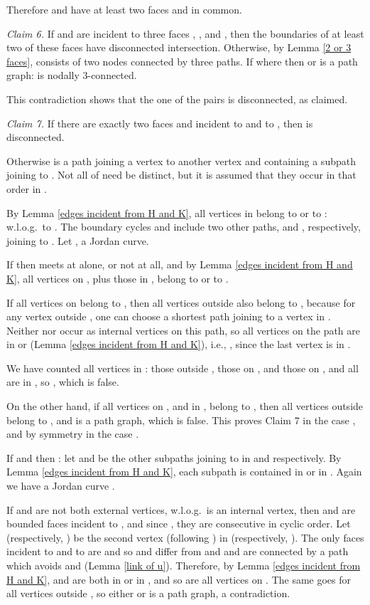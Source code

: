 Therefore  and  have at least two faces  and  in common.

{\em Claim 6.}
If  and  are incident to three faces
, , and , then the boundaries of at least two
of these faces have disconnected intersection.
Otherwise,
by Lemma \ref{2 or 3 faces},  consists of two
nodes  connected by three paths. If 
where  then  or  is
a path graph:  is nodally 3-connected.

This contradiction shows that the one of the pairs
 is disconnected, as
claimed.

{\em Claim 7.}
If there are exactly two faces  and  incident
to  and to ,
then  is disconnected.

Otherwise 
is a path  joining a vertex  to another
vertex  and containing a
subpath  joining  to .  Not all of
 need be distinct, but it is assumed
that they occur in that order in .

By
Lemma \ref{edges incident from H and K},
all vertices in 
belong to  or to : w.l.o.g.\ 
to . The boundary cycles   and
 include two other paths,  and ,
respectively, joining 
to . Let , a Jordan curve.

If  then  meets  at  alone,
or not at all, and by Lemma
\ref{edges incident from H and K}, all vertices on
, plus those in , belong to  or to .

If all vertices on  belong to , then all
vertices outside  also belong to , because for
any vertex  outside , one can choose a shortest
path joining  to a vertex in .
Neither  nor  occur as internal vertices on this
path, so all vertices on the path are in  or  (Lemma
\ref{edges incident from H and K}),
i.e., , since the last vertex is in .

We have counted all vertices in : those outside ,
those on , and those on , and all are in ,
so , which is false.

On the other hand,
if all vertices on , and in , belong to ,
then all vertices outside  belong to ,
and  is a path graph, which is false.
This proves Claim 7 in the case ,
and by symmetry in the case .

If  and  then : let  and
 be the other subpaths joining  to 
in  and  respectively.
By Lemma \ref{edges incident from H and K},
each subpath  is contained in  or
in .  Again we have a Jordan curve
.

If  and  are not both external vertices,
w.l.o.g.\
 is an internal vertex, then
 and  are bounded faces incident to ,
and since ,
they are consecutive in cyclic order.
Let  (respectively, ) be the second
vertex (following ) in  (respectively, ).
The only faces incident to  and to  are 
 and  so  and 
differ from  and
 and  are connected
by a path which avoids  and 
(Lemma \ref{link of u}).
Therefore, by Lemma 
\ref{edges incident from H and K},  and  are both
in  or in , and so are all vertices on .
The same goes
for all vertices outside , so either  or
 is a path graph, a contradiction.


